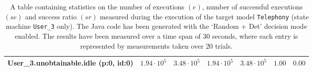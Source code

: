 \begin{table}[htbp]
{\begin{tabular}{lrrrrrr}
\hspace{3mm}User\_3.unobtainable.idle (p:0, id:0)     &  $1.94 \cdot 10^{5}$ &  $3.48 \cdot 10^{5}$ &  $1.94 \cdot 10^{5}$ &  $3.48 \cdot 10^{5}$ &               $1.00$ &               $0.00$ \\
\bottomrule
\end{tabular}
}
\caption{A table containing statistics on the number of executions $(e)$, number of successful executions $(se)$ and success ratio $(sr)$ measured during the execution of the target model \texttt{Telephony} (state machine \texttt{User\_3} only). The Java code has been generated with the `Random + Det' decision mode enabled. The results have been measured over a time span of 30 seconds, where each entry is represented by measurements taken over 20 trials.}
\label{table:frequency_results_telephony_random_det_user_3}
\end{table}